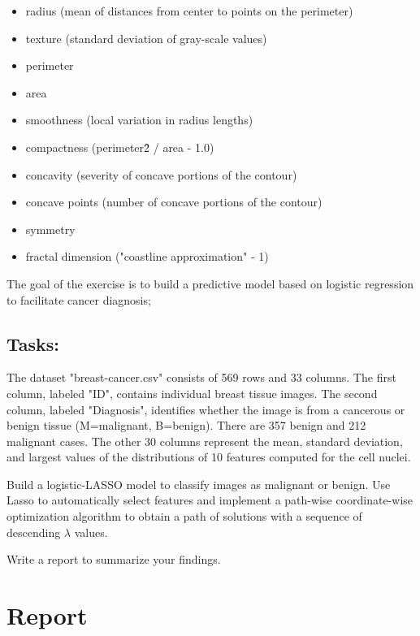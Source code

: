 \documentclass[
]{article}
\begin{document}
\begin{itemize}
\item radius (mean of distances from center to points on the perimeter)
\item texture (standard deviation of gray-scale values)
\item perimeter
\item area
\item smoothness (local variation in radius lengths)
\item compactness (perimeter\^ 2 / area - 1.0)
\item concavity (severity of concave portions of the contour)
\item concave points (number of concave portions of the contour)
\item symmetry
\item fractal dimension ("coastline approximation" - 1)
\end{itemize}

The goal of the exercise is to build a predictive model based on
logistic regression to facilitate cancer diagnosis;

\hypertarget{tasks}{%
\subsection{Tasks:}\label{tasks}}

\begin{enumerate}

The dataset "breast-cancer.csv" consists of 569 rows and 33 columns. The first column, labeled "ID", contains individual breast tissue images. The second column, labeled "Diagnosis", identifies whether the image is from a cancerous or benign tissue (M=malignant, B=benign). There are 357 benign and 212 malignant cases. The other 30 columns represent the mean, standard deviation, and largest values of the distributions of 10 features computed for the cell nuclei.

 Build a logistic-LASSO model to classify images as malignant or benign. Use Lasso to automatically select features and implement a path-wise coordinate-wise optimization algorithm to obtain a path of solutions with a sequence of descending $\lambda$ values.

 Write a report to summarize your findings.
\end{enumerate}

\hypertarget{report}{%
\section{Report}\label{report}}
\end{document}

